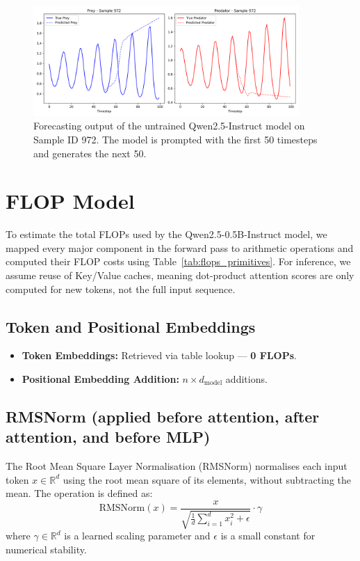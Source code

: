 \documentclass[a4paper,12pt]{article}
\begin{document}
  \begin{figure}[h]
      \centering
      \includegraphics[width=0.9\textwidth]{sample972_untrained.png}
      \caption{Forecasting output of the untrained Qwen2.5-Instruct model on Sample ID 972. The model is prompted with the first 50 timesteps and generates the next 50.}
      \label{fig:sample972_untrained}
  \end{figure}
  

  \section{FLOP Model}

To estimate the total FLOPs used by the Qwen2.5-0.5B-Instruct model, we mapped every major component in the forward pass to arithmetic operations and computed their FLOP costs using Table~\ref{tab:flops_primitives}. For inference, we assume reuse of Key/Value caches, meaning dot-product attention scores are only computed for new tokens, not the full input sequence.

\subsection*{Token and Positional Embeddings}
\begin{itemize}
  \item \textbf{Token Embeddings:} Retrieved via table lookup — \textbf{0 FLOPs}.
  \item \textbf{Positional Embedding Addition:} $n \times d_{\text{model}}$ additions.
\end{itemize}

\subsection*{RMSNorm (applied before attention, after attention, and before MLP)}

The Root Mean Square Layer Normalisation (RMSNorm) \citep{zhang2019root} normalises each input token $x \in \mathbb{R}^d$ using the root mean square of its elements, without subtracting the mean. The operation is defined as:
\begin{equation}
\text{RMSNorm}(x) = \frac{x}{\sqrt{\frac{1}{d} \sum_{i=1}^{d} x_i^2 + \epsilon}} \cdot \gamma
\end{equation}
where $\gamma \in \mathbb{R}^d$ is a learned scaling parameter and $\epsilon$ is a small constant for numerical stability.
\end{document}
